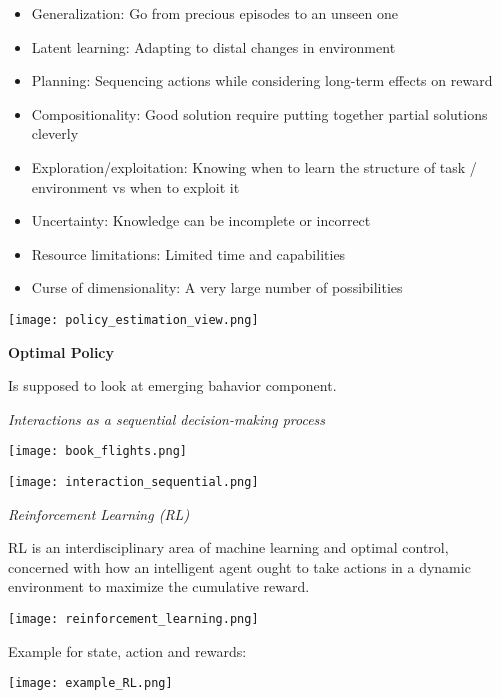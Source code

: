\begin{itemize}[itemsep=-5pt, topsep=0pt, leftmargin=*]
	\item Generalization: Go from precious episodes to an unseen one
	\item Latent learning: Adapting to distal changes in environment
	\item Planning: Sequencing actions while considering long-term effects on reward
	\item Compositionality: Good solution require putting together partial solutions cleverly
	\item Exploration/exploitation: Knowing when to learn the structure of task / environment vs when to exploit it
	\item Uncertainty: Knowledge can be incomplete or incorrect
	\item Resource limitations: Limited time and capabilities
	\item Curse of dimensionality: A very large number of possibilities
\end{itemize}

\begin{center}
	\texttt{[image: policy\_estimation\_view.png]}
\end{center}


\textbf{Optimal Policy}

Is supposed to look at emerging bahavior component. \medskip

\textit{Interactions as a sequential decision-making process} \smallskip

\begin{center}
	\texttt{[image: book\_flights.png]}
\end{center}

\begin{center}
	\texttt{[image: interaction\_sequential.png]}
\end{center}


\textit{Reinforcement Learning (RL)} \smallskip

RL is an interdisciplinary area of machine learning and optimal control, concerned with how an intelligent agent ought to take actions in a dynamic environment to maximize the cumulative reward. 

\begin{center}
	\texttt{[image: reinforcement\_learning.png]}
\end{center}

Example for state, action and rewards: 
\begin{center}
	\texttt{[image: example\_RL.png]}
\end{center}

